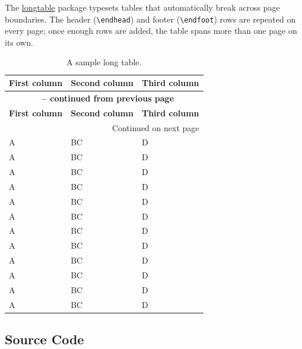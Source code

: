 The \href{https://ctan.org/pkg/longtable}{longtable} package typesets tables that automatically break across page boundaries.
The header (\verb+\endhead+) and footer (\verb+\endfoot+) rows are repeated on every page; once enough rows are added, the table spans more than one page on its own.

\begin{ltgexample}
\begin{longtable}{lll}
  \caption{A sample long table.}\label{tab:long} \\
  \toprule
  \textbf{First column} & \textbf{Second column} & \textbf{Third column} \\
  \midrule
  \endfirsthead

  \multicolumn{3}{c}{{\bfseries \tablename\ \thetable{} -- continued from previous page}} \\
  \toprule
  \textbf{First column} & \textbf{Second column} & \textbf{Third column} \\
  \midrule
  \endhead

  \midrule
  \multicolumn{3}{r}{{Continued on next page}} \\
  \endfoot

  \bottomrule
  \endlastfoot

  A & BC & D \\
  A & BC & D \\
  A & BC & D \\
  A & BC & D \\
  A & BC & D \\
  A & BC & D \\
  A & BC & D \\
  A & BC & D \\
  A & BC & D \\
  A & BC & D \\
  A & BC & D \\
  A & BC & D \\
\end{longtable}
\end{ltgexample}

\subsection{Source Code}

